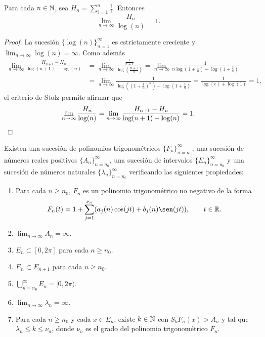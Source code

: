 \documentclass[a4paper, 12pt, oneside]{book}
\begin{document}
\begin{lemma}\label{2.2.8}
    Para cada $n \in \mathbb N$, sea $H_n = \sum_{i=1}^n \frac{1}{i}$. Entonces
    \[\lim_{n \to \infty} \frac{H_n}{\log(n)} = 1.\]
\end{lemma}

\begin{proof}
    La sucesión $\{\log(n)\}_{n=1}^\infty$ es estrictamente creciente y $\lim_{n\to\infty} \log(n) = \infty$. Como además
    \begin{align*}
        \lim_{n\to\infty}\frac{H_{n+1}-H_n}{\log(n+1)-\log(n)} &= \lim_{n\to\infty} \frac{\frac{1}{n+1}}{\log(\frac{n+1}{n})} = \lim_{n\to\infty}\frac{1}{n\log(1+\frac{1}{n})+\log(1+\frac{1}{n})} 
        \\ &= \lim_{n\to\infty}\frac{1}{\log((1+\frac{1}{n})^n)+\log(1+\frac{1}{n})} = \frac{1}{\log(e)+\log(1)} = 1,
    \end{align*}
    el criterio de Stolz permite afirmar que
    \[\lim_{n\to\infty}\frac{H_n}{\log(n)} = \lim_{n\to\infty}\frac{H_{n+1}-H_n}{\log(n+1)-\log(n)} = 1.\qedhere\]
\end{proof}

\begin{lemma}
    Existen una sucesión de polinomios trigonométricos $\{F_n\}_{n=n_0}^\infty$, una sucesión de números reales positivos $\{A_n\}_{n=n_0}^\infty$, una sucesión de intervalos $\{E_n\}_{n=n_0}^\infty$ y una sucesión de números naturales $\{\lambda_n\}_{n=n_0}^\infty$ verificando las siguientes propiedades:
    \begin{enumerate}
        \item Para cada $n \geq n_0$, $F_n$ es un polinomio trigonométrico no negativo de la forma
        \[F_n(t)=1+\sum_{j=1}^{\nu_n}(a_j(n)\cos(jt)+b_j(n)\sen(jt)), \qquad t \in \R.\]
        \item $\lim_{n \to \infty} A_n = \infty$.
        \item $E_n \subset [0,2\pi]$ para cada $n \geq n_0$.
        \item $E_n \subset E_{n+1}$ para cada $n \geq n_0$.
        \item $\bigcup_{n=n_0}^\infty E_n = [0,2\pi)$.
        \item $\lim_{n\to\infty} \lambda_n = \infty$.
        \item Para cada $n \geq n_0$ y cada $x \in E_n$, existe $k \in \mathbb N$ con $S_kF_n(x) > A_n$ y tal que $\lambda_n \leq k \leq \nu_n$, donde $\nu_n$ es el grado del polinomio trigonométrico $F_n$.
    \end{enumerate}
\end{lemma}
\end{document}
